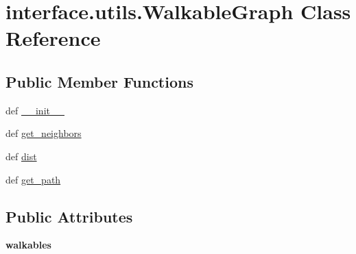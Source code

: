 \hypertarget{classinterface_1_1utils_1_1_walkable_graph}{\section{interface.\-utils.\-Walkable\-Graph \-Class \-Reference}
\label{classinterface_1_1utils_1_1_walkable_graph}
}
\subsection*{\-Public \-Member \-Functions}
\begin{DoxyCompactItemize}
\item 
def \hyperlink{classinterface_1_1utils_1_1_walkable_graph_ab278b45be983e6f0a0867e92f874bf9e}{\-\_\-\-\_\-init\-\_\-\-\_\-}
\item 
def \hyperlink{classinterface_1_1utils_1_1_walkable_graph_a7767f3578dbbe420d17c3fd276b0db89}{get\-\_\-neighbors}
\item 
def \hyperlink{classinterface_1_1utils_1_1_walkable_graph_af3bf5d30e760b5086ef700465009d226}{dist}
\item 
def \hyperlink{classinterface_1_1utils_1_1_walkable_graph_aa0a83b900040d019fae13289cf70521a}{get\-\_\-path}
\end{DoxyCompactItemize}
\subsection*{\-Public \-Attributes}
\begin{DoxyCompactItemize}
\item 
\hypertarget{classinterface_1_1utils_1_1_walkable_graph_a51e03368d01089484beeb703ce69104e}{{\bfseries walkables}}\label{classinterface_1_1utils_1_1_walkable_graph_a51e03368d01089484beeb703ce69104e}

\end{DoxyCompactItemize}



